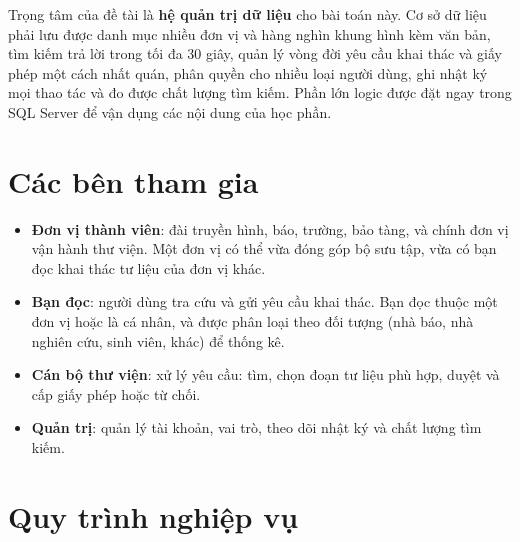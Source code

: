 Trọng tâm của đề tài là \textbf{hệ quản trị dữ liệu} cho bài toán này. Cơ sở dữ liệu phải
lưu được danh mục nhiều đơn vị và hàng nghìn khung hình kèm văn bản, tìm kiếm trả lời trong
tối đa 30 giây, quản lý vòng đời yêu cầu khai thác và giấy phép một cách nhất quán, phân
quyền cho nhiều loại người dùng, ghi nhật ký mọi thao tác và đo được chất lượng tìm kiếm.
Phần lớn logic được đặt ngay trong SQL Server để vận dụng các nội dung của học phần.

\section{Các bên tham gia}

\begin{itemize}
    \item \textbf{Đơn vị thành viên}: đài truyền hình, báo, trường, bảo tàng, và chính đơn vị
    vận hành thư viện. Một đơn vị có thể vừa đóng góp bộ sưu tập, vừa có bạn đọc khai thác tư
    liệu của đơn vị khác.
    \item \textbf{Bạn đọc}: người dùng tra cứu và gửi yêu cầu khai thác. Bạn đọc thuộc một đơn
    vị hoặc là cá nhân, và được phân loại theo đối tượng (nhà báo, nhà nghiên cứu, sinh viên,
    khác) để thống kê.
    \item \textbf{Cán bộ thư viện}: xử lý yêu cầu: tìm, chọn đoạn tư liệu phù hợp, duyệt và
    cấp giấy phép hoặc từ chối.
    \item \textbf{Quản trị}: quản lý tài khoản, vai trò, theo dõi nhật ký và chất lượng tìm
    kiếm.
\end{itemize}

\section{Quy trình nghiệp vụ}

